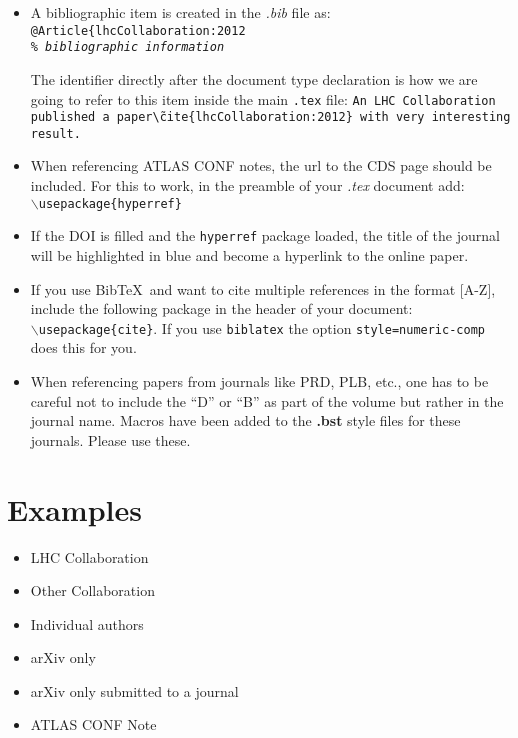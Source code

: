 \documentclass[UKenglish]{style/atlasdoc}
\newcommand*{\BibTeX}{Bib\TeX}
\begin{document}
\begin{itemize}
\item A bibliographic item is created in the \emph{.bib} file as: \\
	\texttt{@Article\{lhcCollaboration:2012 \\ \emph{\% bibliographic information}}
	
	The identifier directly after the document type declaration is how we are going to refer to this item inside the main \texttt{.tex} file:
	\texttt{An LHC Collaboration published a paper\~ \textbackslash cite\{lhcCollaboration:2012\}
	with very interesting result.}
\item When referencing ATLAS CONF notes, the url to the CDS page should be included. For this to work, in the preamble of your \emph{.tex} document add: \\
	\texttt{$\backslash$usepackage\{hyperref\}}
\item If the DOI is filled and the \texttt{hyperref} package loaded, the title of the journal will be highlighted in blue and become a hyperlink to the online paper.
\item If you use \BibTeX\ and want to cite multiple references in the format [A-Z], include the following package in the 	header of your document: \\
	\texttt{$\backslash$usepackage\{cite\}}.
	If you use \texttt{biblatex} the option \texttt{style=numeric-comp} does this for you.
\item When referencing papers from journals like PRD, PLB, etc.,
	one has to be careful not to include the ``D'' or ``B'' as part of the volume but rather in the journal name. 
	Macros have been added to the \textbf{.bst} style files for these journals. Please use these.
\end{itemize}


\section{Examples}

\begin{itemize}
	\item LHC Collaboration~\cite{lhcCollaboration:2012}
	\item Other Collaboration~\cite{otherCollaboration:2007}
	\item Individual authors~\cite{authors:2008}
	\item arXiv only~\cite{arxivOnly:2009}
	\item arXiv only submitted to a journal~\cite{arxivSub:2011}
	\item ATLAS CONF Note~\cite{atlasConf:2012} 
\end{itemize}
\end{document}
